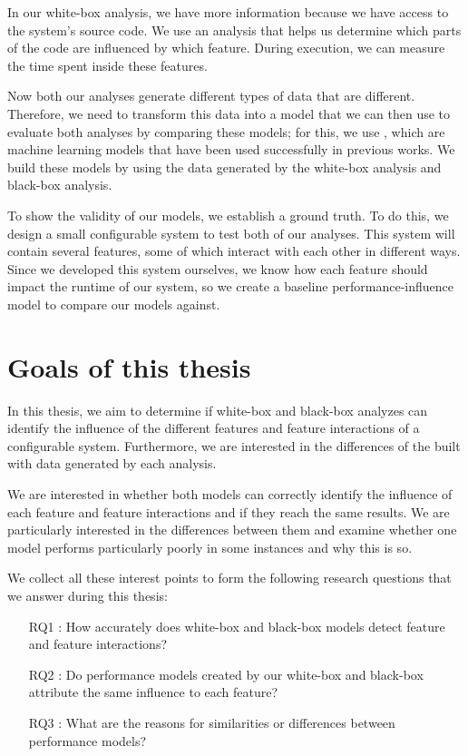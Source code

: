 In our white-box analysis, we have more information because we have access to the system's source code.
We use an analysis that helps us determine which parts of the code are influenced by which feature.
During execution, we can measure the time spent inside these features.

Now both our analyses generate different types of data that are different. 
Therefore, we need to transform this data into a model that we can then use to evaluate both analyses by comparing these models; 
for this, we use \perfInfluenceModel, which are machine learning models that have been used successfully in previous works.
We build these models by using the data generated by the white-box analysis and black-box analysis. 

To show the validity of our models, we establish a ground truth. To do this, we design a small configurable system to test both of our 
analyses. This system will contain several features, some of which interact with each other in different ways. 
Since we developed this system ourselves, we know how each feature should impact the runtime of our system, so we create
a baseline performance-influence model to compare our models against.


\section{Goals of this thesis}
In this thesis, we aim to determine if white-box and black-box analyzes can identify the influence of the different features and 
feature interactions of a configurable system.
Furthermore, we are interested in the differences of the  built with data generated by each analysis.

We are interested in whether both models can correctly identify the influence of each feature and feature interactions and
if they reach the same results.
We are particularly interested in the %
differences between them and examine whether one model performs particularly poorly in some instances and why this is so.

We collect all these interest points to form the following research questions that we answer during this thesis:

\begin{itemize}\label{researchQuestions}
\item[RQ1]: How accurately does white-box and black-box models detect feature and feature interactions? 
\item[RQ2]: Do performance models created by our white-box and black-box attribute the same influence to each feature?
\item[RQ3]: What are the reasons for similarities or differences between performance models?
\end{itemize}
